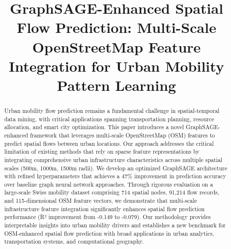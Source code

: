 \documentclass[twocolumn,11pt]{IEEEtran}  %
\begin{document}
\title{GraphSAGE-Enhanced Spatial Flow Prediction: Multi-Scale OpenStreetMap Feature Integration for Urban Mobility Pattern Learning}

\author{
\and
{}
}

\maketitle

\begin{abstract}
Urban mobility flow prediction remains a fundamental challenge in spatial-temporal data mining, with critical applications spanning transportation planning, resource allocation, and smart city optimization. This paper introduces a novel GraphSAGE-enhanced framework that leverages multi-scale OpenStreetMap (OSM) features to predict spatial flows between urban locations. Our approach addresses the critical limitation of existing methods that rely on sparse feature representations by integrating comprehensive urban infrastructure characteristics across multiple spatial scales (500m, 1000m, 1500m radii). We develop an optimized GraphSAGE architecture with refined hyperparameters that achieves a 47\% improvement in prediction accuracy over baseline graph neural network approaches. Through rigorous evaluation on a large-scale Swiss mobility dataset comprising 714 spatial nodes, 91,214 flow records, and 115-dimensional OSM feature vectors, we demonstrate that multi-scale infrastructure feature integration significantly enhances spatial flow prediction performance (R² improvement from -0.149 to -0.079). Our methodology provides interpretable insights into urban mobility drivers and establishes a new benchmark for OSM-enhanced spatial flow prediction with broad applications in urban analytics, transportation systems, and computational geography.
\end{abstract}
\end{document}
